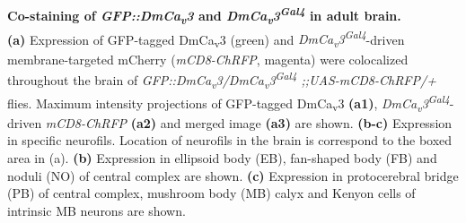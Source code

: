 \label{fig:S1}
\textbf{Co-staining of \emph{GFP::DmCa\textsubscript{v}3} and \emph{DmCa\textsubscript{v}3\textsuperscript{Gal4}} in adult brain.}
\\
\textbf{(a)} Expression of GFP-tagged DmCa\textsubscript{v}3 (green) and \emph{DmCa\textsubscript{v}3\textsuperscript{Gal4}}-driven membrane-targeted mCherry (\emph{mCD8-ChRFP}, magenta) were colocalized throughout the brain of \emph{GFP::DmCa\textsubscript{v}3/DmCa\textsubscript{v}3\textsuperscript{Gal4} ;;UAS-mCD8-ChRFP/+} flies.
Maximum intensity projections of GFP-tagged DmCa\textsubscript{v}3 \textbf{(a1)},  \emph{DmCa\textsubscript{v}3\textsuperscript{Gal4}}-driven \emph{mCD8-ChRFP} \textbf{(a2)} and merged image \textbf{(a3)} are shown.
\textbf{(b-c)} Expression in specific neurofils. Location of neurofils in the brain is correspond to the boxed area in (a).
\textbf{(b)} Expression in ellipsoid body (EB), fan-shaped body (FB) and noduli (NO) of central complex are shown.
\textbf{(c)} Expression in protocerebral bridge (PB) of central complex, mushroom body (MB) calyx and Kenyon cells of intrinsic MB neurons are shown. 
  
  
  
  